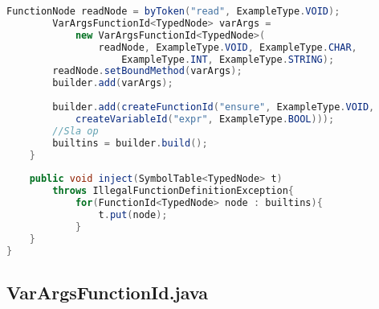 \begin{lstlisting}[language=Java]
		FunctionNode readNode = byToken("read", ExampleType.VOID);
		VarArgsFunctionId<TypedNode> varArgs = 
            new VarArgsFunctionId<TypedNode>(
                readNode, ExampleType.VOID, ExampleType.CHAR, 
                    ExampleType.INT, ExampleType.STRING);
		readNode.setBoundMethod(varArgs);
		builder.add(varArgs);
		
		builder.add(createFunctionId("ensure", ExampleType.VOID,	
            createVariableId("expr", ExampleType.BOOL)));
		//Sla op
		builtins = builder.build();
	}
	
	public void inject(SymbolTable<TypedNode> t) 
        throws IllegalFunctionDefinitionException{
		    for(FunctionId<TypedNode> node : builtins){
		    	t.put(node);
		    }
	}
}

\end{lstlisting}
\subsection{VarArgsFunctionId.java}
